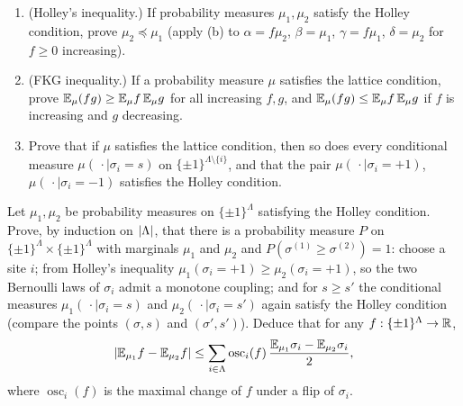 \begin{exercise}
\begin{enumerate}[label=(\alph*)]
$A,B\subset\{\pm1\}^\Lambda$, where $A\vee B=\{\sigma\vee\sigma':\sigma\in A,\sigma'\in B\}$.
\item (Holley's inequality.)  If probability measures $\mu_1,\mu_2$ satisfy
the Holley condition, prove $\mu_2\preceq\mu_1$ (apply (b) to
$\alpha=f\mu_2$, $\beta=\mu_1$, $\gamma=f\mu_1$, $\delta=\mu_2$ for
$f\ge0$ increasing).
\item (FKG inequality.)  If a probability measure $\mu$ satisfies the lattice
condition, prove $\mathbb E_\mu(fg)\ge\mathbb E_\mu f\,\mathbb E_\mu g$ for all increasing $f,g$,
and $\mathbb E_\mu(fg)\le\mathbb E_\mu f\,\mathbb E_\mu g$ if $f$ is increasing and $g$ decreasing.
\item Prove that if $\mu$ satisfies the lattice condition, then so does every
conditional measure $\mu(\,\cdot\mid\sigma_i=s)$ on $\{\pm1\}^{\Lambda\setminus\{i\}}$,
and that the pair $\mu(\,\cdot\mid\sigma_i=+1)$, $\mu(\,\cdot\mid\sigma_i=-1)$
satisfies the Holley condition.
\end{enumerate}
\end{exercise}

\begin{exercise}
Let $\mu_1,\mu_2$ be probability measures on $\{\pm1\}^\Lambda$ satisfying
the Holley condition.  Prove, by induction on $\left\lvert \Lambda\right\rvert$, that there is a
probability measure $P$ on $\{\pm1\}^\Lambda\times\{\pm1\}^\Lambda$ with
marginals $\mu_1$ and $\mu_2$ and $P(\sigma^{(1)}\ge\sigma^{(2)})=1$: choose
a site $i$; from Holley's inequality $\mu_1(\sigma_i=+1)\ge\mu_2(\sigma_i=+1)$,
so the two Bernoulli laws of $\sigma_i$ admit a monotone coupling; and for
$s\ge s'$ the conditional measures $\mu_1(\,\cdot\mid\sigma_i=s)$ and
$\mu_2(\,\cdot\mid\sigma_i=s')$ again satisfy the Holley condition (compare
the points $(\sigma,s)$ and $(\sigma',s')$).  Deduce that for any
$f:\{\pm1\}^\Lambda\to\mathbb R$,
\[
 \left\lvert \mathbb E_{\mu_1}f-\mathbb E_{\mu_2}f\right\rvert\le\sum_{i\in\Lambda}\operatorname{osc}_i(f)\,
 \frac{\mathbb E_{\mu_1}\sigma_i-\mathbb E_{\mu_2}\sigma_i}2,
\]
where $\operatorname{osc}_i(f)$ is the maximal change of $f$ under a flip of
$\sigma_i$.
\end{exercise}

